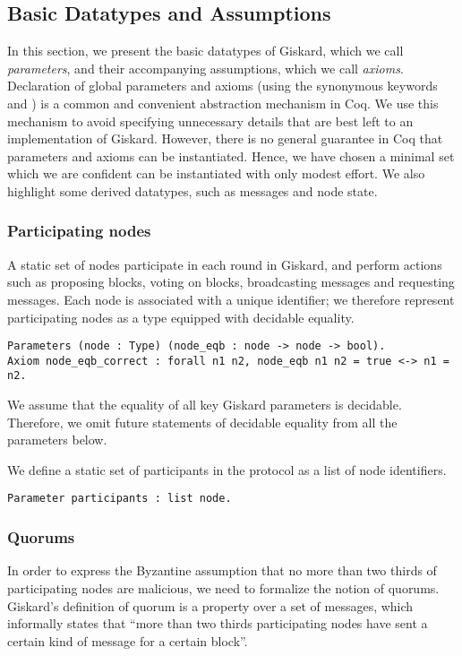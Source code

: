 \documentclass{easychair}
\begin{document}
\subsection{Basic Datatypes and Assumptions}
In this section, we present the basic datatypes of Giskard, which we call \emph{parameters}, and their accompanying assumptions, which we call \emph{axioms}. Declaration of global parameters and axioms (using the synonymous keywords  and ) is a common and convenient abstraction mechanism in Coq. We use this mechanism to avoid specifying unnecessary details that are best left to an implementation of Giskard. However, there is no general guarantee in Coq that parameters and axioms can be instantiated. Hence, we have chosen a minimal set which we are confident can be instantiated with only modest effort. We also highlight some derived datatypes, such as messages and node state.

\subsubsection{Participating nodes} 
A static set of nodes participate in each round in Giskard, and perform actions such as proposing blocks, voting on blocks, broadcasting messages and requesting messages.
Each node is associated with a unique identifier; we therefore represent participating nodes as a type equipped with decidable equality.

\begin{lstlisting}[language=Coq]
Parameters (node : Type) (node_eqb : node -> node -> bool).
Axiom node_eqb_correct : forall n1 n2, node_eqb n1 n2 = true <-> n1 = n2.
\end{lstlisting}

We assume that the equality of all key Giskard parameters is decidable. Therefore, we omit future statements of decidable equality from all the parameters below. 

We define a static set of participants in the protocol as a list of node identifiers.
\begin{lstlisting}[language=Coq]
Parameter participants : list node. 
\end{lstlisting}

\subsubsection{Quorums} 
In order to express the Byzantine assumption that no more than two thirds of participating nodes are malicious, we need to formalize the notion of quorums. Giskard's definition of quorum is a property over a set of messages, which informally states that ``more than two thirds participating nodes have sent a certain kind of message for a certain block''. 
\end{document}
